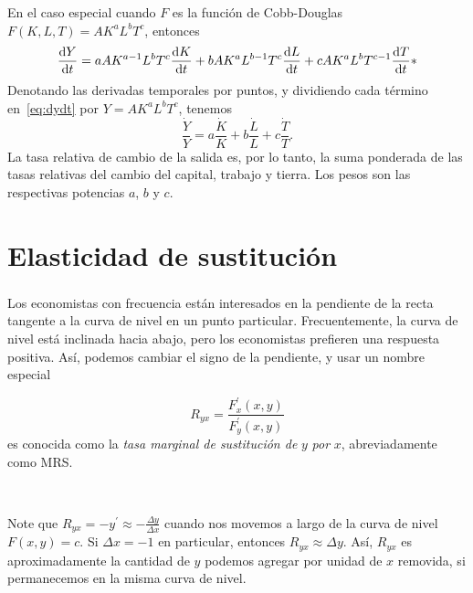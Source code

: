 \begin{frame}[t]
\frametitle{\subsecname}

\begin{example}
En el caso especial cuando $F$ es la función de Cobb-Douglas $F\left(K,L,T\right)=AK^{a}L^{b}T^{c}$, entonces
\begin{equation}\label{eq:dydt}
\frac{\mathrm{d}Y}{\mathrm{d}t}=aAK^{a-1}L^{b}T^{c}\frac{\mathrm{d}K}{\mathrm{d}t}+bAK^{a}L^{b-1}T^{c}\frac{\mathrm{d}L}{\mathrm{d}t}+cAK^{a}L^{b}T^{c-1}\frac{\mathrm{d}T}{\mathrm{d}t}\notag{*}
\end{equation}
Denotando las derivadas temporales por puntos, y dividiendo cada término en~\eqref{eq:dydt} por $Y=AK^{a}L^{b}T^{c}$, tenemos \[ \frac{\dot{Y}}{Y}=a\frac{\dot{K}}{K}+b\frac{\dot{L}}{L}+c\frac{\dot{T}}{T}. \] La tasa relativa de cambio de la salida es, por lo tanto, la suma ponderada de las tasas relativas del cambio del capital, trabajo y tierra. Los pesos son las respectivas potencias $a$, $b$ y $c$.
\end{example}

\end{frame}

\section{Elasticidad de sustitución}

\begin{frame}[t]
\frametitle{\secname}

Los economistas con frecuencia están interesados en la pendiente de la recta tangente a la curva de nivel en un punto particular. Frecuentemente, la curva de nivel está inclinada hacia abajo, pero los economistas prefieren una respuesta positiva. Así, podemos cambiar el signo de la pendiente, y usar un nombre especial

\begin{definition}
\begin{equation}
R_{yx}=\frac{F^{\prime}_{x}\left(x,y\right)}{F^{\prime}_{y}\left(x,y\right)}
\end{equation}
es conocida como la \emph{tasa marginal de sustitución de} $y$ \emph{por} $x$, abreviadamente como \textsc{MRS}.
\end{definition}

\

Note que $R_{yx}=-y^{\prime}\approx-\frac{\Delta y}{\Delta x}$ cuando nos movemos a largo de la curva de nivel $F\left(x,y\right)=c$. Si $\Delta x=-1$ en particular, entonces $R_{yx}\approx\Delta y$. Así, $R_{yx}$ es aproximadamente la cantidad de $y$ podemos agregar por unidad de $x$ removida, si permanecemos en la misma curva de nivel.
\end{frame}

